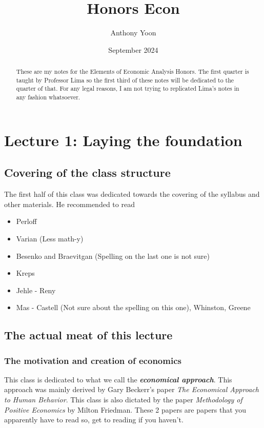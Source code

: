 \documentclass{article}
\title{Honors Econ}
\author{Anthony Yoon}
\date{September 2024}
\begin{document}
\maketitle
\tableofcontents


\begin{abstract}
    These are my notes for the Elements of Economic Analysis Honors. The first quarter is taught by Professor Lima so the first third of these notes will be dedicated to the quarter of that. For any legal reasons, I am not trying to replicated Lima's notes in any fashion whatsoever. 
\end{abstract}

\section{Lecture 1: Laying the foundation}
\subsection{Covering of the class structure}
The first half of this class was dedicated towards the covering of the syllabus and other materials. He recommended to read 
\begin{itemize}
    \item Perloff
    \item Varian (Less math-y)
    \item Besenko and Braevitgan (Spelling on the last one is not sure)
    \item Kreps
    \item Jehle - Reny 
    \item Mas - Castell (Not sure about the spelling on this one), Whinston, Greene
\end{itemize}
\subsection{The actual meat of this lecture}
\subsubsection{The motivation and creation of economics}
This class is dedicated to what we call the \textbf{\textit{economical approach}}. This approach was mainly derived by Gary Beckerr's paper \textit{The Economical Approach to Human Behavior}. This class is also dictated by the paper \textit{Methodology of Positive Economics} by Milton Friedman. These 2 papers are papers that you apparently have to read so, get to reading if you haven't. \\
\end{document}
